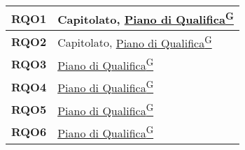 \begin{longtable}{|>{\centering\arraybackslash}m{}|>{\centering\arraybackslash}m{}|}
	\textbf{RQO1}            & Capitolato, \href{https://code7crusaders.github.io/docs/PB/documentazione_interna/glossario.html#piano-di-qualifica}{Piano di Qualifica\textsuperscript{G}}\\\hline
	\textbf{RQO2}            & Capitolato, \href{https://code7crusaders.github.io/docs/PB/documentazione_interna/glossario.html#piano-di-qualifica}{Piano di Qualifica\textsuperscript{G}}\\\hline
	\textbf{RQO3}            & \href{https://code7crusaders.github.io/docs/PB/documentazione_interna/glossario.html#piano-di-qualifica}{Piano di Qualifica\textsuperscript{G}}\\\hline
    \textbf{RQO4}            & \href{https://code7crusaders.github.io/docs/PB/documentazione_interna/glossario.html#piano-di-qualifica}{Piano di Qualifica\textsuperscript{G}}\\\hline
	\textbf{RQO5}            & \href{https://code7crusaders.github.io/docs/PB/documentazione_interna/glossario.html#piano-di-qualifica}{Piano di Qualifica\textsuperscript{G}}\\\hline
	\textbf{RQO6}            & \href{https://code7crusaders.github.io/docs/PB/documentazione_interna/glossario.html#piano-di-qualifica}{Piano di Qualifica\textsuperscript{G}}\\\hline


\end{longtable}
